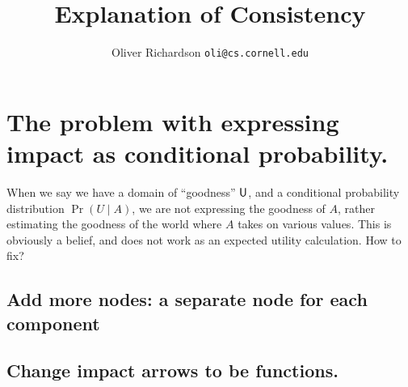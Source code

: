 \documentclass{article}
\title{Explanation of Consistency}
\author{Oliver Richardson  \texttt{oli@cs.cornell.edu}}
\begin{document}

	\section{The problem with expressing impact as conditional probability.}
	
	When we say we have a domain of ``goodness'' $\sf U$, and a conditional probability distribution $\Pr(U \mid A)$, we are not expressing the goodness of $A$, rather estimating the goodness of the world where $A$ takes on various values. This is obviously a belief, and does not work as an expected utility calculation.  How to fix?
	
	\subsection{Add more nodes: a separate node for each component}
	
	\subsection{Change impact arrows to be functions.}
	
	
\end{document}
